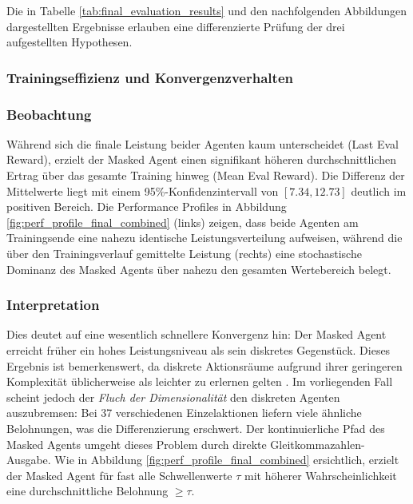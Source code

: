 Die in Tabelle \ref{tab:final_evaluation_results} und den nachfolgenden Abbildungen dargestellten Ergebnisse erlauben eine differenzierte Prüfung der drei aufgestellten Hypothesen.

\subsubsection{Trainingseffizienz und Konvergenzverhalten}

\subsubsection*{Beobachtung}
Während sich die finale Leistung beider Agenten kaum unterscheidet (Last Eval Reward), erzielt der Masked Agent einen signifikant höheren durchschnittlichen Ertrag über das gesamte Training hinweg (Mean Eval Reward). Die Differenz der Mittelwerte liegt mit einem 95\%-Konfidenzintervall von $[7.34, 12.73]$ deutlich im positiven Bereich. Die Performance Profiles in Abbildung \ref{fig:perf_profile_final_combined} (links) zeigen, dass beide Agenten am Trainingsende eine nahezu identische Leistungsverteilung aufweisen, während die über den Trainingsverlauf gemittelte Leistung (rechts) eine stochastische Dominanz des Masked Agents über nahezu den gesamten Wertebereich belegt.

\subsubsection*{Interpretation}
Dies deutet auf eine wesentlich schnellere Konvergenz hin: Der Masked Agent erreicht früher ein hohes Leistungsniveau als sein diskretes Gegenstück. Dieses Ergebnis ist bemerkenswert, da diskrete Aktionsräume aufgrund ihrer geringeren Komplexität üblicherweise als leichter zu erlernen gelten \cite[Kapitel 13.1]{sutton2018rl}. Im vorliegenden Fall scheint jedoch der \textit{Fluch der Dimensionalität} \cite{lillicrap2015continuous} den diskreten Agenten auszubremsen: Bei 37 verschiedenen Einzelaktionen liefern viele ähnliche Belohnungen, was die Differenzierung erschwert. Der kontinuierliche Pfad des Masked Agents umgeht dieses Problem durch direkte Gleitkommazahlen-Ausgabe. Wie in Abbildung \ref{fig:perf_profile_final_combined} ersichtlich, erzielt der Masked Agent für fast alle Schwellenwerte $\tau$ mit höherer Wahrscheinlichkeit eine durchschnittliche Belohnung $\ge \tau$.

